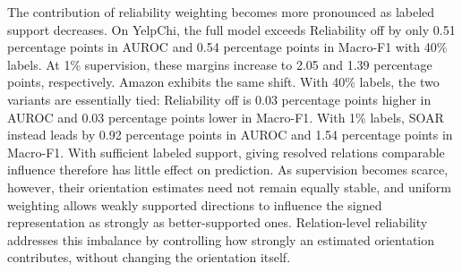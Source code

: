 \documentclass[10pt,journal]{IEEEtran}
\begin{document}
The contribution of reliability weighting becomes more pronounced as labeled
support decreases. On YelpChi, the full model exceeds Reliability off by only
0.51 percentage points in AUROC and 0.54 percentage points in Macro-F1 with
40\% labels. At 1\% supervision, these margins increase to 2.05 and
1.39 percentage points, respectively. Amazon exhibits the same shift. With
40\% labels, the two variants are essentially tied: Reliability off is
0.03 percentage points higher in AUROC and 0.03 percentage points lower in
Macro-F1. With 1\% labels, SOAR instead leads by 0.92 percentage points in
AUROC and 1.54 percentage points in Macro-F1. With sufficient labeled support, giving resolved relations comparable
influence therefore has little effect on prediction. As supervision becomes
scarce, however, their orientation estimates need not remain equally stable,
and uniform weighting allows weakly supported directions to influence the
signed representation as strongly as better-supported ones. Relation-level
reliability addresses this imbalance by controlling how strongly an estimated
orientation contributes, without changing the orientation itself.

\begin{table}[!h]
\centering
\caption{Effect of dual-path prediction under abundant and scarce
supervision. All entries are mean AUROC and Macro-F1 (\%).}
\label{tab:dualpath}
\scriptsize
\setlength{\tabcolsep}{2.8pt}
\renewcommand{\arraystretch}{1.10}
\end{table}
\end{document}
